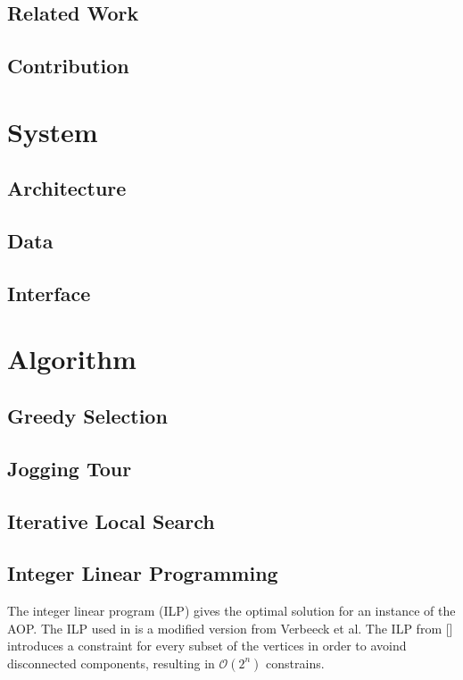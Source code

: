 \documentclass[sigconf,natbib=false]{acmart}
\begin{document}
\subsection{Related Work}
\subsection{Contribution}

\section{System}

\subsection{Architecture}

\subsection{Data}

\subsection{Interface}

\section{Algorithm}

\subsection{Greedy Selection}

\subsection{Jogging Tour}

\subsection{Iterative Local Search}

\subsection{Integer Linear Programming}

The integer linear program (ILP) gives the optimal solution for an instance of the AOP. The ILP used in \tG is a modified version from Verbeeck et al. 
The ILP from [] introduces a constraint for every subset of the vertices in order to avoind disconnected components, resulting in $\mathcal{O}(2^n)$ constrains.
\end{document}

